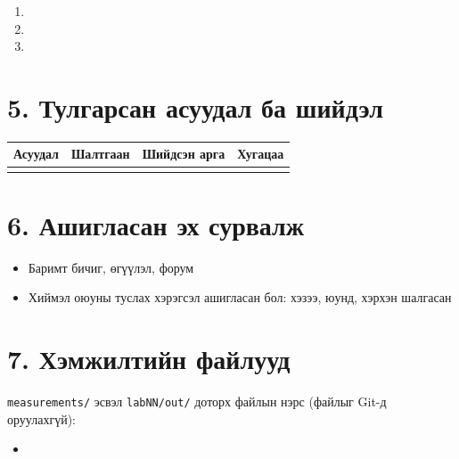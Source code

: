 \begin{enumerate}
\def\labelenumi{\arabic{enumi}.}
\tightlist
\item
\item
\item
\end{enumerate}

\hypertarget{ux442ux443ux43bux433ux430ux440ux441ux430ux43d-ux430ux441ux443ux443ux434ux430ux43b-ux431ux430-ux448ux438ux439ux434ux44dux43b}{%
\section{5. Тулгарсан асуудал ба шийдэл}\label{ux442ux443ux43bux433ux430ux440ux441ux430ux43d-ux430ux441ux443ux443ux434ux430ux43b-ux431ux430-ux448ux438ux439ux434ux44dux43b}}

\begingroup\scriptsize\begin{longtable}[]{@{}llll@{}}
\toprule
Асуудал & Шалтгаан & Шийдсэн арга & Хугацаа\tabularnewline
\midrule
\endhead
& & &\tabularnewline
\bottomrule
\end{longtable}\endgroup

\hypertarget{ux430ux448ux438ux433ux43bux430ux441ux430ux43d-ux44dux445-ux441ux443ux440ux432ux430ux43bux436}{%
\section{6. Ашигласан эх сурвалж}\label{ux430ux448ux438ux433ux43bux430ux441ux430ux43d-ux44dux445-ux441ux443ux440ux432ux430ux43bux436}}

\begin{itemize}
\tightlist
\item
  Баримт бичиг, өгүүлэл, форум
\item
  Хиймэл оюуны туслах хэрэгсэл ашигласан бол: хэзээ, юунд, хэрхэн шалгасан
\end{itemize}

\hypertarget{ux445ux44dux43cux436ux438ux43bux442ux438ux439ux43d-ux444ux430ux439ux43bux443ux443ux434}{%
\section{7. Хэмжилтийн файлууд}\label{ux445ux44dux43cux436ux438ux43bux442ux438ux439ux43d-ux444ux430ux439ux43bux443ux443ux434}}

\texttt{measurements/} эсвэл \texttt{labNN/out/} доторх файлын нэрс (файлыг Git-д оруулахгүй):

\begin{itemize}
\tightlist
\item
\end{itemize}
